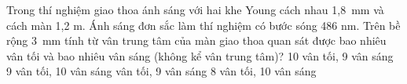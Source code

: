 \begin{ex}%
Trong thí nghiệm giao thoa ánh sáng với hai khe Young cách nhau 1,8\ mm và cách màn 1,2 m. Ánh sáng đơn sắc làm thí nghiệm có bước sóng 486 nm. Trên bề rộng 3\ mm tính từ vân trung tâm của màn giao thoa quan sát được bao nhiêu vân tối và bao nhiêu vân sáng (không kể vân trung tâm)?
\choice
{10 vân tối, 9 vân sáng}
{9 vân tối, 10 vân sáng}
{ vân tối, 9 vân sáng}
{8 vân tối, 10 vân sáng}
\end{ex} 

